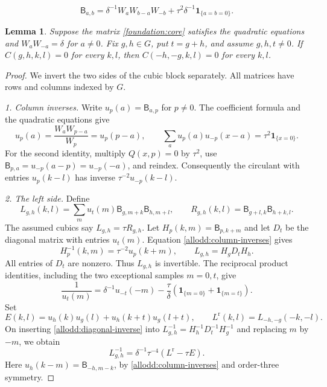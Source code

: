 \documentclass[10pt,a4paper]{amsart}
\newtheorem{lemma}{Lemma}
\newcommand{\ind}[1]{\mathbf1_{\{#1\}}}
\begin{document}
\begin{equation}\label{tail:uniform-core}
 \mathsf B_{a,b}=\delta^{-1}W_aW_{b-a}W_{-b}
                  +\tau^2\delta^{-1}\ind{a=b=0}.
\end{equation}

\begin{lemma}\label{allodd:reflection}
Suppose the matrix \eqref{foundation:core} satisfies the quadratic equations
and $W_aW_{-a}=\delta$ for $a\ne0$.  Fix $g,h\in G$, put $t=g+h$, and assume $g,h,t\ne0$.  If $C(g,h,k,l)=0$ for every $k,l$, then
$C(-h,-g,k,l)=0$ for every $k,l$.
\end{lemma}

\begin{proof}
We invert the two sides of the cubic block separately. All matrices
have rows and columns indexed by $G$.

\emph{1. Column inverses.} Write $u_p(a)=\mathsf B_{a,p}$ for
$p\ne0$.  The coefficient formula and the quadratic equations give
\begin{equation}\label{allodd:column-inverses}
 u_p(a)=\frac{W_aW_{p-a}}{W_p}=u_p(p-a),\qquad
 \sum_a u_p(a)u_{-p}(x-a)=\tau^2\ind{x=0}.
\end{equation}
For the second identity, multiply $Q(x,p)=0$ by $\tau^2$,
use $\mathsf B_{p,a}=u_{-p}(a-p)=u_{-p}(-a)$, and reindex.
Consequently the circulant with entries $u_p(k-l)$ has inverse
$\tau^{-2}u_{-p}(k-l)$.

\emph{2. The left side.} Define
\[
 L_{g,h}(k,l)=\sum_m u_t(m)\mathsf B_{g,m+k}
                                      \mathsf B_{h,m+l},
 \qquad
 R_{g,h}(k,l)=\mathsf B_{g+l,k}\mathsf B_{h+k,l}.
\]
The assumed cubics say $L_{g,h}=\tau R_{g,h}$.
Let $H_p(k,m)=\mathsf B_{p,k+m}$ and let $D_t$ be the
diagonal matrix with entries $u_t(m)$.  Equation
\eqref{allodd:column-inverses} gives
\[
 H_p^{-1}(k,m)=\tau^{-2}u_p(k+m),\qquad
 L_{g,h}=H_gD_tH_h.
\]
All entries of $D_t$ are nonzero.  Thus $L_{g,h}$ is invertible.
The reciprocal product identities, including the two exceptional samples $m=0,t$,
give
\begin{equation}\label{allodd:diagonal-inverse}
 \frac1{u_t(m)}=\delta^{-1}u_{-t}(-m)
       -\frac{\tau}{\delta}
                    (\ind{m=0}+\ind{m=t}).
\end{equation}
Set
\[
 E(k,l)=u_h(k)u_g(l)+u_h(k+t)u_g(l+t),
 \qquad
 L^{\mathrm r}(k,l)=L_{-h,-g}(-k,-l).
\]
On inserting \eqref{allodd:diagonal-inverse} into
$L_{g,h}^{-1}=H_h^{-1}D_t^{-1}H_g^{-1}$ and replacing
$m$ by $-m$, we obtain
\begin{equation}\label{allodd:left-inverse}
 L_{g,h}^{-1}=\delta^{-1}\tau^{-4}
                         (L^{\mathrm r}-\tau E).
\end{equation}
Here $u_h(k-m)=\mathsf B_{-h,m-k}$, by
\eqref{allodd:column-inverses} and order-three symmetry.


\end{proof}
\end{document}
